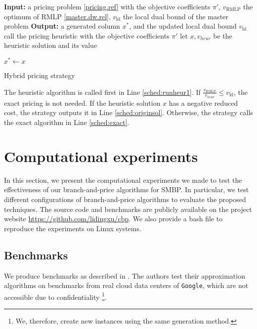 \begin{algorithm}[htbp]
\SetAlgoLined
 \textbf{Input:} a pricing problem  \eqref{pricing.ref} with the objective coefficients $\pi'$,  \(v_{\mathrm{RMLP}}\) the optimum of RMLP \eqref{master.dw.rel},  \(v_{\mathrm{ld}}\) the local dual bound of the master problem\;
   \textbf{Output:} a generated column $x^\ast$,  and the updated local dual bound $v_{\mathrm{ld}}$\;
  \label{sched:updateweights}
 call the pricing heuristic with the objective coefficients  $ \pi'$  \label{sched:runheur1}
 let $x, v_{heur}$  be the heuristic solution and its value\;
 {

    $x^\ast \leftarrow x$  \label{sched:originsol}
 }
 \caption{Hybrid pricing strategy}
 \label{sched}
\end{algorithm}

 The heuristic algorithm is called first in Line \ref{sched:runheur1}. If  $\frac{v_{\mathrm{RMLP}}}{v_{heur}} \le v_{\mathrm{ld}}$, the exact pricing is not needed.  If the heuristic solution $x$ has a negative reduced cost, the strategy outputs it in Line \ref{sched:originsol}. Otherwise, the strategy calls the exact algorithm in Line \ref{sched:exact}.
 
 


\section{Computational experiments}
\label{sec.experi}
In this section, we present the computational experiments we made to test the effectiveness of our branch-and-price algorithms for SMBP. In particular, we test different configurations of branch-and-price algorithms to evaluate the proposed techniques. The source code and benchmarks are publicly available on the project website \href{https://github.com/lidingxu/cbp}{https://github.com/lidingxu/cbp}. We also provide a bash file to reproduce the experiments on Linux systems.
\subsection{Benchmarks}
We produce benchmarks as described in \cite{cohen2019overcommitment}. The authors test their approximation algorithms on benchmarks from real cloud data centers of \texttt{Google}, which are not accessible due to confidentiality \footnote{We, therefore, create new instances using the same generation method.}.

